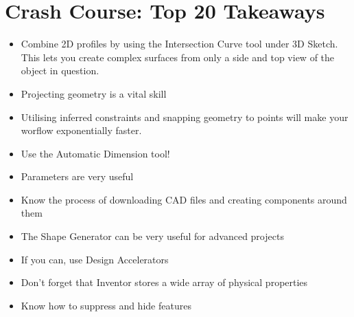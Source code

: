 \chapter{Crash Course: Top 20 Takeaways}

\begin{itemize}
\item Combine 2D profiles by using the Intersection Curve tool under 3D Sketch. This lets you create complex surfaces from only a side and top view of the object in question.
\item Projecting geometry is a vital skill
\item Utilising inferred constraints and snapping geometry to points will make your worflow exponentially faster.
\item Use the Automatic Dimension tool!
\item Parameters are very useful
\item Know the process of downloading CAD files and creating components around them
\item The Shape Generator can be very useful for advanced projects
\item If you can, use Design Accelerators
\item Don't forget that Inventor stores a wide array of physical properties
\item Know how to suppress and hide features
\end{itemize}